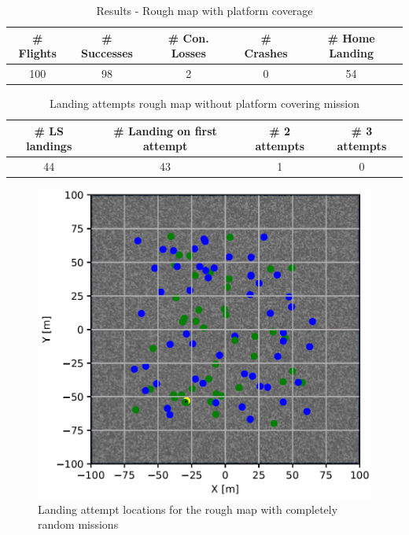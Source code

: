     \begin{table}[h]
        \begin{center}
         \caption{Results - Rough map with platform coverage}\vspace{1ex}
         \label{tab:result_rough_rand}
         \begin{tabular}{|c|c|c|c|c|}
         \hline
         \# Flights & \# Successes & \# Con. Losses & \# Crashes & \# Home Landing\\ \hline \hline
         100 & 98 & 2 & 0 & 54 \\
         \hline
         \end{tabular}
        \end{center}
    \end{table}

    \begin{table}[h]
        \begin{center}
         \caption{Landing attempts rough map without platform covering mission}\vspace{1ex}
         \label{tab:land_nums_rough_rand}
         \begin{tabular}{|c|c|c|c|}
         \hline
         \# LS landings & \# Landing on first attempt & \# 2 attempts & \# 3 attempts\\ \hline \hline
         44 & 43 & 1 & 0 \\
         \hline
         \end{tabular}
        \end{center}
    \end{table}

    \begin{figure}[h]
    \centering
    \includegraphics[scale=0.5]{images/evaluation/landing_rough_rand.png}
    \caption{Landing attempt locations for the rough map with completely random missions}
    \label{fig:land_rough_rand}
    \end{figure}

